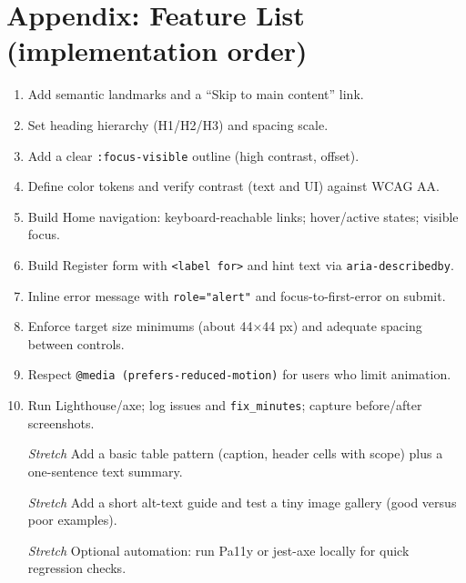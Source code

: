 \documentclass[12pt]{article}
\begin{document}
\section*{Appendix: Feature List (implementation order)}
\begin{enumerate}
  \item Add semantic landmarks and a “Skip to main content” link.
  \item Set heading hierarchy (H1/H2/H3) and spacing scale.
  \item Add a clear \texttt{:focus-visible} outline (high contrast, offset).
  \item Define color tokens and verify contrast (text and UI) against WCAG AA.
  \item Build Home navigation: keyboard-reachable links; hover/active states; visible focus.
  \item Build Register form with \texttt{<label for>} and hint text via \texttt{aria-describedby}.
  \item Inline error message with \texttt{role="alert"} and focus-to-first-error on submit.
  \item Enforce target size minimums (about 44×44 px) and adequate spacing between controls.
  \item Respect \texttt{@media (prefers-reduced-motion)} for users who limit animation.
  \item Run Lighthouse/axe; log issues and \texttt{fix\_minutes}; capture before/after screenshots.
  \item[\textit{Stretch}] Add a basic table pattern (caption, header cells with scope) plus a one-sentence text summary.
  \item[\textit{Stretch}] Add a short alt-text guide and test a tiny image gallery (good versus poor examples).
  \item[\textit{Stretch}] Optional automation: run Pa11y or jest-axe locally for quick regression checks.
\end{enumerate}

\nocite{bennett2018inclusive, huang2024a11yfigma, chen2024figmaapps, shi2023uxaccesspractice}

\clearpage


\end{document}
